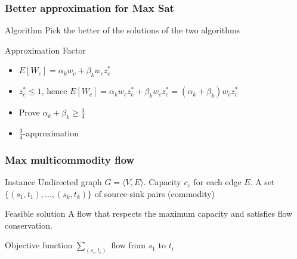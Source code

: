\documentclass[12pt,aspectratio=169]{beamer}
\begin{document}
\begin{frame}\frametitle{Better approximation for Max Sat}
\begin{block}{Algorithm}
Pick the better of the solutions of the two algorithms
\end{block}
\begin{block}{Approximation Factor}
  \begin{itemize}
  \item
    $E[W_{c}] = \alpha_{k}w_{c} + \beta_{k}w_{c}z_{c}^{*}$
  \item
    $z_{c}^{*}\le 1$, hence $E[W_{c}] = \alpha_{k}w_{c}z_{c}^{*} + \beta_{k}w_{c}z_{c}^{*}
    = \left(\alpha_{k} + \beta_{k}\right) w_{c}z_{c}^{*}$
  \item
    Prove $\alpha_{k} + \beta_{k} \ge \frac{3}{4}$
  \item
    $\frac{3}{4}$-approximation
  \end{itemize}
\end{block}
\end{frame}

\begin{frame}\frametitle{Max multicommodity flow}
  \begin{block}{Instance}
    Undirected graph $G=\langle V,E \rangle$.
%
    Capacity $c_{e}$ for each edge $E$.
%
    A set $\{(s_{1}, t_{1}), \ldots , (s_{k}, t_{k})\}$ of source-sink pairs (commodity)
  \end{block}
  \begin{block}{Feasible solution}
    A flow that respects the maximum capacity and satisfies flow conservation.
%
  \end{block}
    \begin{block}{Objective function}
      $\sum_{(s_{i}, t_{i})}$ flow from $s_{1}$ to $t_{i}$
    \end{block}
\end{frame}
\end{document}
